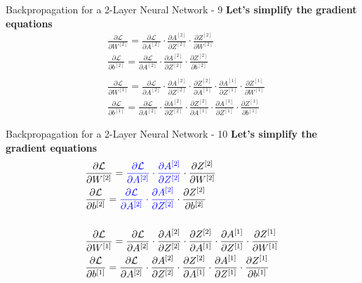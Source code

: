 \documentclass[aspectratio=169]{beamer}
\begin{document}
%
%
\begin{frame}{Backpropagation for a 2-Layer Neural Network - 9}
\textbf{Let's simplify the gradient equations}
\begin{align*}
&\frac{\partial \mathcal{L}}{\partial W^{[2]}} = \frac{\partial \mathcal{L}}{\partial A^{[2]}} \cdot \frac{\partial A^{[2]}}{\partial Z^{[2]}} \cdot\frac{\partial Z^{[2]}}{\partial W^{[2]}}
\\
&\frac{\partial \mathcal{L}}{\partial b^{[2]}} = \frac{\partial \mathcal{L}}{\partial A^{[2]}} \cdot \frac{\partial A^{[2]}}{\partial Z^{[2]}} \cdot \frac{\partial Z^{[2]}}{\partial b^{[2]}}
\\
&\\
&\frac{\partial \mathcal{L}}{\partial W^{[1]}} = \frac{\partial \mathcal{L}}{\partial A^{[2]}} \cdot \frac{\partial A^{[2]}}{\partial Z^{[2]}} \cdot \frac{\partial Z^{[2]}}{\partial A^{[1]}} \cdot \frac{\partial A^{[1]}}{\partial Z^{[1]}} \cdot \frac{\partial Z^{[1]}}{\partial W^{[1]}}
\\
&\frac{\partial \mathcal{L}}{\partial b^{[1]}} = \frac{\partial \mathcal{L}}{\partial A^{[2]}} \cdot \frac{\partial A^{[2]}}{\partial Z^{[2]}} \cdot \frac{\partial Z^{[2]}}{\partial A^{[1]}} \cdot \frac{\partial A^{[1]}}{\partial Z^{[1]}} \cdot \frac{\partial Z^{[1]}}{\partial b^{[1]}}
\end{align*}
\end{frame}
%
%
\begin{frame}{Backpropagation for a 2-Layer Neural Network - 10}
\textbf{Let's simplify the gradient equations}
\begin{align*}
&\frac{\partial \mathcal{L}}{\partial W^{[2]}} = \textcolor{blue}{\frac{\partial \mathcal{L}}{\partial A^{[2]}} \cdot \frac{\partial A^{[2]}}{\partial Z^{[2]}}} \cdot\frac{\partial Z^{[2]}}{\partial W^{[2]}}
\\
&\frac{\partial \mathcal{L}}{\partial b^{[2]}} = \textcolor{blue}{\frac{\partial \mathcal{L}}{\partial A^{[2]}} \cdot \frac{\partial A^{[2]}}{\partial Z^{[2]}}} \cdot \frac{\partial Z^{[2]}}{\partial b^{[2]}}
\\
&\\
&\frac{\partial \mathcal{L}}{\partial W^{[1]}} = \frac{\partial \mathcal{L}}{\partial A^{[2]}} \cdot \frac{\partial A^{[2]}}{\partial Z^{[2]}} \cdot \frac{\partial Z^{[2]}}{\partial A^{[1]}} \cdot \frac{\partial A^{[1]}}{\partial Z^{[1]}} \cdot \frac{\partial Z^{[1]}}{\partial W^{[1]}}
\\
&\frac{\partial \mathcal{L}}{\partial b^{[1]}} = \frac{\partial \mathcal{L}}{\partial A^{[2]}} \cdot \frac{\partial A^{[2]}}{\partial Z^{[2]}} \cdot \frac{\partial Z^{[2]}}{\partial A^{[1]}} \cdot \frac{\partial A^{[1]}}{\partial Z^{[1]}} \cdot \frac{\partial Z^{[1]}}{\partial b^{[1]}}
\end{align*}
\end{frame}
\end{document}
